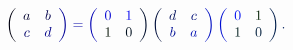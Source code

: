 \documentclass[12pt]{article}
\begin{document}
\makeatletter
\renewcommand*{\@textcolor}[3]{%
  \protect\leavevmode
  \begingroup
    \color#1{#2}#3%
  \endgroup
}
\makeatother
\begin{displaymath}
\mathcolor[RGB]{0,0,15}{\left(} \begin{array} {cc} \mathcolor[RGB]{0,0,30}{\textstyle} { \mathcolor[RGB]{0,0,45}{a} } & \mathcolor[RGB]{0,0,60}{\textstyle} { \mathcolor[RGB]{0,0,75}{b} } \\ \mathcolor[RGB]{0,0,90}{\textstyle} { \mathcolor[RGB]{0,0,105}{c} } & \mathcolor[RGB]{0,0,120}{\textstyle} { \mathcolor[RGB]{0,0,135}{d} } \end{array} \mathcolor[RGB]{0,0,150}{\right)} \mathcolor[RGB]{0,0,165}{=} \mathcolor[RGB]{0,0,180}{\left(} \begin{array} {cc} \mathcolor[RGB]{0,0,195}{\textstyle} { \mathcolor[RGB]{0,0,210}{0} } & \mathcolor[RGB]{0,0,225}{\textstyle} { \mathcolor[RGB]{0,0,240}{1} } \\ \mathcolor[RGB]{0,0,255}{\textstyle} { \mathcolor[RGB]{0,15,0}{1} } & \mathcolor[RGB]{0,15,15}{\textstyle} { \mathcolor[RGB]{0,15,30}{0} } \end{array} \mathcolor[RGB]{0,15,45}{\right)} \mathcolor[RGB]{0,15,60}{\left(} \begin{array} {cc} \mathcolor[RGB]{0,15,75}{\textstyle} { \mathcolor[RGB]{0,15,90}{d} } & \mathcolor[RGB]{0,15,105}{\textstyle} { \mathcolor[RGB]{0,15,120}{c} } \\ \mathcolor[RGB]{0,15,135}{\textstyle} { \mathcolor[RGB]{0,15,150}{b} } & \mathcolor[RGB]{0,15,165}{\textstyle} { \mathcolor[RGB]{0,15,180}{a} } \end{array} \mathcolor[RGB]{0,15,195}{\right)} \mathcolor[RGB]{0,15,210}{\left(} \begin{array} {cc} \mathcolor[RGB]{0,15,225}{\textstyle} { \mathcolor[RGB]{0,15,240}{0} } & \mathcolor[RGB]{0,15,255}{\textstyle} { \mathcolor[RGB]{0,30,0}{1} } \\ \mathcolor[RGB]{0,30,15}{\textstyle} { \mathcolor[RGB]{0,30,30}{1} } & \mathcolor[RGB]{0,30,45}{\textstyle} { \mathcolor[RGB]{0,30,60}{0} } \end{array} \mathcolor[RGB]{0,30,75}{\right)} \mathcolor[RGB]{0,30,90}{.}
\end{displaymath}
\end{document}
